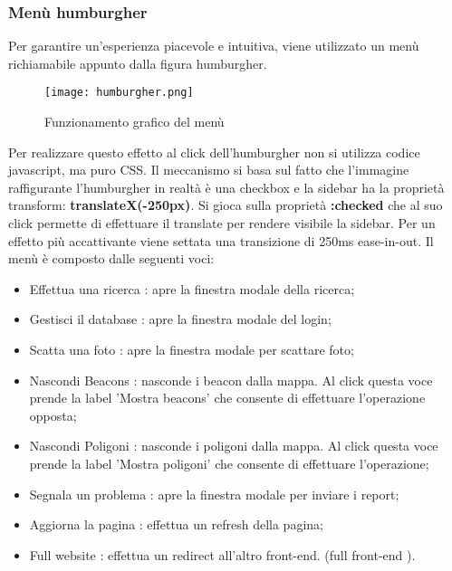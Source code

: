 \subsubsection{Menù humburgher}
Per garantire un'esperienza piacevole e intuitiva, viene utilizzato un menù richiamabile appunto dalla figura humburgher.
\begin{figure}[h]
	\centering
	\caption{Funzionamento grafico del menù}
	\label{fig:humburgher}
	\texttt{[image: humburgher.png]}
\end{figure} 
Per realizzare questo effetto al click dell'humburgher non si utilizza codice javascript, ma puro CSS.
Il meccanismo si basa sul fatto che l'immagine raffigurante l'humburgher in realtà è una checkbox e la sidebar ha la proprietà transform: \textbf{translateX(-250px)}. Si gioca sulla proprietà \textbf{:checked } che al suo click permette di effettuare il translate per rendere visibile la sidebar. Per un effetto più accattivante viene settata una transizione di 250ms ease-in-out.
\newline \newline
Il menù è composto dalle seguenti voci:
\begin{itemize}
\item Effettua una ricerca : apre la finestra modale della ricerca;
\item Gestisci il database : apre la finestra modale del login;
\item Scatta una foto : apre la finestra modale per scattare foto;
\item Nascondi Beacons : nasconde i beacon dalla mappa. Al click questa voce prende la label 'Mostra beacons' che consente di effettuare l'operazione opposta;
\item Nascondi Poligoni : nasconde i poligoni dalla mappa. Al click questa voce prende la label 'Mostra poligoni' che consente di effettuare l'operazione;
\item Segnala un problema : apre la finestra modale per inviare i report;
\item Aggiorna la pagina : effettua un refresh della pagina;
\item Full website : effettua un redirect all'altro front-end. (full front-end ).
\end{itemize}

